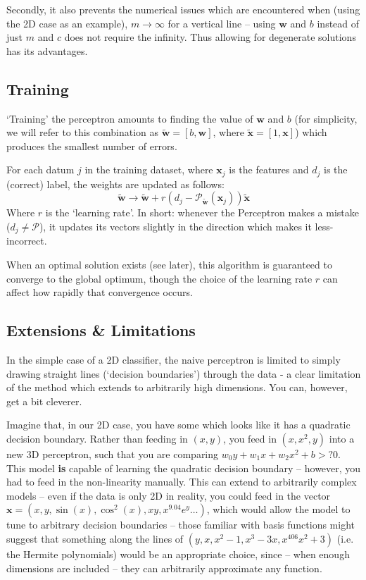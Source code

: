 \documentclass[10pt, twocolumn]{article}
\renewcommand\vec[1]{\boldsymbol{\textbf{#1}}}
\newcommand\cec[1]{\tilde{\vec{#1}}}
\begin{document}
		Secondly, it also prevents the numerical issues which are encountered when (using the 2D case as an example), $m\to\infty$ for a vertical line -- using $\vec{w}$ and $b$ instead of just $m$ and $c$ does not require the infinity. Thus allowing for degenerate solutions has its advantages. 
		
		\subsection{Training}

		`Training' the perceptron amounts to finding the value of $\vec{w}$ and $b$ (for simplicity, we will refer to this combination as $\cec{w} = [b,\vec{w}]$, where $\cec{x} = [1,\vec{x}]$) which produces the smallest number of errors. 

		For each datum $j$ in the training dataset, where $\vec{x}_j$ is the features and $d_j$ is the (correct) label, the weights are updated as follows:
		\begin{equation}
			\cec{w} \to \cec{w} + r \left( d_j - \mathcal{P}_{\cec{w}}(\vec{x}_j) \right) \cec{x}
		\end{equation}
		Where $r$ is the `learning rate'. In short: whenever the Perceptron makes a mistake ($d_j \neq \mathcal{P}$), it updates its vectors slightly in the direction which makes it less-incorrect.

		When an optimal solution exists (see later), this algorithm is guaranteed to converge to the global optimum, though the choice of the learning rate $r$ can affect how rapidly that convergence occurs.

		\subsection{Extensions \& Limitations}

			In the simple case of a 2D classifier, the naive perceptron is limited to simply drawing straight lines (`decision boundaries') through the data - a clear limitation of the method which extends to arbitrarily high dimensions. You can, however, get a bit cleverer.
			
			Imagine that, in our 2D case, you have some which looks like it has a quadratic decision boundary. Rather than feeding in $(x,y)$, you feed in $(x,x^2,y)$ into a new 3D perceptron, such that you are comparing $w_0 y + w_1 x + w_2 x^2 + b >? 0$. This model \textbf{is} capable of learning the quadratic decision boundary -- however, you had to feed in the non-linearity manually. This can extend to arbitrarily complex models -- even if the data is only 2D in reality, you could feed in the vector $\vec{x} = (x,y,\sin(x), \cos^2(x), xy, x^9.04 e^y \hdots)$, which would allow the model to tune to arbitrary decision boundaries -- those familiar with basis functions might suggest that something along the lines of $(y,x,x^2-1,x^3-3x,x^406x^2+3)$ (i.e. the Hermite polynomials) would be an appropriate choice, since -- when enough dimensions are included -- they can arbitrarily approximate any function.
\end{document}
